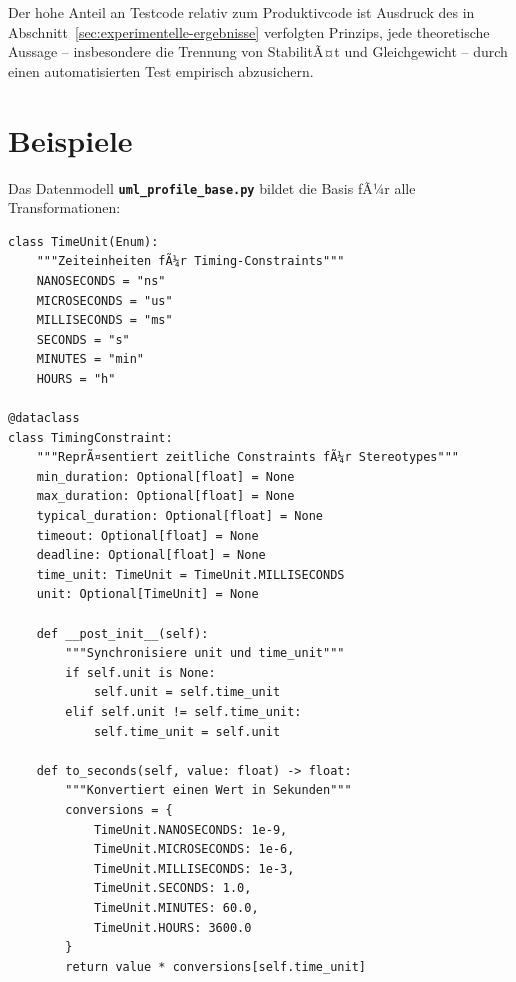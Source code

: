 ﻿\documentclass[a4paper,12pt]{report}
\theoremstyle{definition}
\begin{document}
Der hohe Anteil an Testcode relativ zum Produktivcode ist Ausdruck des in Abschnitt~\ref{sec:experimentelle-ergebnisse} verfolgten Prinzips, jede theoretische Aussage -- insbesondere die Trennung von StabilitÃ¤t und Gleichgewicht -- durch einen automatisierten Test empirisch abzusichern.

\section{Beispiele}

Das Datenmodell \texttt{\textbf{uml\_profile\_base.py}} bildet die Basis fÃ¼r alle Transformationen:
\begin{lstlisting}[style=python, caption={TimingConstraint Klasse}, label={lst:timing-constraint}]
class TimeUnit(Enum):
    """Zeiteinheiten fÃ¼r Timing-Constraints"""
    NANOSECONDS = "ns"
    MICROSECONDS = "us"
    MILLISECONDS = "ms"
    SECONDS = "s"
    MINUTES = "min"
    HOURS = "h"

@dataclass
class TimingConstraint:
    """ReprÃ¤sentiert zeitliche Constraints fÃ¼r Stereotypes"""
    min_duration: Optional[float] = None 
    max_duration: Optional[float] = None 
    typical_duration: Optional[float] = None 
    timeout: Optional[float] = None 
    deadline: Optional[float] = None 
    time_unit: TimeUnit = TimeUnit.MILLISECONDS
    unit: Optional[TimeUnit] = None 
    
    def __post_init__(self):
        """Synchronisiere unit und time_unit"""
        if self.unit is None:
            self.unit = self.time_unit
        elif self.unit != self.time_unit:
            self.time_unit = self.unit
    
    def to_seconds(self, value: float) -> float:
        """Konvertiert einen Wert in Sekunden"""
        conversions = {
            TimeUnit.NANOSECONDS: 1e-9,
            TimeUnit.MICROSECONDS: 1e-6,
            TimeUnit.MILLISECONDS: 1e-3,
            TimeUnit.SECONDS: 1.0,
            TimeUnit.MINUTES: 60.0,
            TimeUnit.HOURS: 3600.0
        }
        return value * conversions[self.time_unit]
\end{lstlisting}
\end{document}
